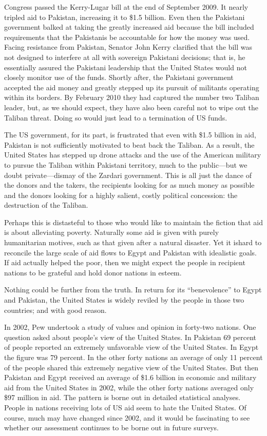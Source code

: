 \documentclass[10pt]{article}
\begin{document}
{\large Congress passed the Kerry-Lugar bill at the end of September 2009. It
nearly tripled aid to Pakistan, increasing it to \$1.5 billion. Even then the
Pakistani government balked at taking the greatly increased aid because the bill
included requirements that the Pakistanis be accountable for how the money was
used. Facing resistance from Pakistan, Senator John Kerry clarified that the bill
was not designed to interfere at all with sovereign Pakistani decisions; that is,
he essentially assured the Pakistani leadership that the United States would not
closely monitor use of the funds. Shortly after, the Pakistani government
accepted the aid money and greatly stepped up its pursuit of militants operating
within its borders. By February 2010 they had captured the number two Taliban
leader, but, as we should expect, they have also been careful not to wipe out the
Taliban threat. Doing so would just lead to a termination of US funds.}

{\large The US government, for its part, is frustrated that even with \$1.5
billion in aid, Pakistan is not sufficiently motivated to beat back the Taliban.
As a result, the United States has stepped up drone attacks and the use of the
American military to pursue the Taliban within Pakistani territory, much to the
public---but we doubt private---dismay of the Zardari government. This is all
just the dance of the donors and the takers, the recipients looking for as much
money as possible and the donors looking for a highly salient, costly political
concession: the destruction of the Taliban.}

{\large Perhaps this is distasteful to those who would like to maintain the
fiction that aid is about alleviating poverty. Naturally some aid is given with
purely humanitarian motives, such as that given after a natural disaster. Yet it
ishard to reconcile the large scale of aid flows to Egypt and Pakistan with
idealistic goals. If aid actually helped the poor, then we might expect the
people in recipient nations to be grateful and hold donor nations in esteem.}

{\large Nothing could be further from the truth. In return for its
``benevolence'' to Egypt and Pakistan, the United States is widely reviled by the
people in those two countries; and with good reason.}

{\large In 2002, Pew undertook a study of values and opinion in forty-two
nations. One question asked about people's view of the United States. In Pakistan
69 percent of people reported an extremely unfavorable view of the United States.
In Egypt the figure was 79 percent. In the other forty nations an average of only
11 percent of the people shared this extremely negative view of the United
States. But then Pakistan and Egypt received an average of \$1.6 billion in
economic and military aid from the United States in 2002, while the other forty
nations averaged only \$97 million in aid. The pattern is borne out in detailed
statistical analyses. People in nations receiving lots of US aid seem to hate the
United States. Of course, much may have changed since 2002, and it would be
fascinating to see whether our assessment continues to be borne out in future
surveys.}
\end{document}
